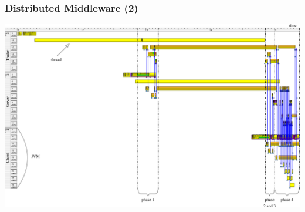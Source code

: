 \begin{frame}
\frametitle{Distributed Middleware (2)}
\includegraphics[width=\textwidth]{figures/Book.pdf}
\end{frame}

